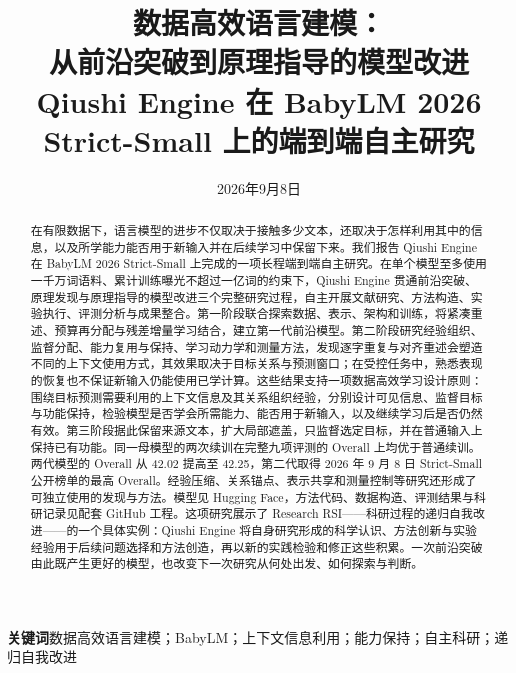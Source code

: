 \documentclass[11pt,a4paper,fontset=none]{ctexart}
\title{数据高效语言建模：\\从前沿突破到原理指导的模型改进\\[2mm]{\large\normalfont Qiushi Engine 在 BabyLM 2026 Strict-Small 上的端到端自主研究}}
\date{2026年9月8日}
\begin{document}
\maketitle
\thispagestyle{plain}
\begin{abstract}
在有限数据下，语言模型的进步不仅取决于接触多少文本，还取决于怎样利用其中的信息，以及所学能力能否用于新输入并在后续学习中保留下来。我们报告 Qiushi Engine 在 BabyLM 2026 Strict-Small 上完成的一项长程端到端自主研究。在单个模型至多使用一千万词语料、累计训练曝光不超过一亿词的约束下，Qiushi Engine 贯通前沿突破、原理发现与原理指导的模型改进三个完整研究过程，自主开展文献研究、方法构造、实验执行、评测分析与成果整合。第一阶段联合探索数据、表示、架构和训练，将紧凑重述、预算再分配与残差增量学习结合，建立第一代前沿模型。第二阶段研究经验组织、监督分配、能力复用与保持、学习动力学和测量方法，发现逐字重复与对齐重述会塑造不同的上下文使用方式，其效果取决于目标关系与预测窗口；在受控任务中，熟悉表现的恢复也不保证新输入仍能使用已学计算。这些结果支持一项数据高效学习设计原则：围绕目标预测需要利用的上下文信息及其关系组织经验，分别设计可见信息、监督目标与功能保持，检验模型是否学会所需能力、能否用于新输入，以及继续学习后是否仍然有效。第三阶段据此保留来源文本，扩大局部遮盖，只监督选定目标，并在普通输入上保持已有功能。同一母模型的两次续训在完整九项评测的 Overall 上均优于普通续训。两代模型的 Overall 从 42.02 提高至 42.25，第二代取得 2026 年 9 月 8 日 Strict-Small 公开榜单的最高 Overall。经验压缩、关系锚点、表示共享和测量控制等研究还形成了可独立使用的发现与方法。模型见 Hugging Face，方法代码、数据构造、评测结果与科研记录见配套 GitHub 工程。这项研究展示了 Research RSI——科研过程的递归自我改进——的一个具体实例：Qiushi Engine 将自身研究形成的科学认识、方法创新与实验经验用于后续问题选择和方法创造，再以新的实践检验和修正这些积累。一次前沿突破由此既产生更好的模型，也改变下一次研究从何处出发、如何探索与判断。
\end{abstract}
\vspace{1mm}
{\small\noindent\textbf{关键词}\quad 数据高效语言建模；BabyLM；上下文信息利用；能力保持；自主科研；递归自我改进}
{\tableofcontents\par}







\FloatBarrier\clearpage
\appendix


\FloatBarrier\clearpage
\begingroup\small{}\setlength{\bibsep}{2pt}


\endgroup
\end{document}
